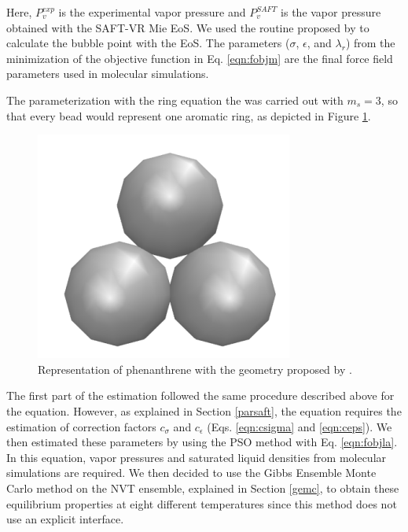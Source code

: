 Here, $P_{v}^{exp}$ is the experimental vapor pressure and $P_{v}^{SAFT}$ is the vapor pressure obtained with the SAFT-VR Mie EoS. We used the routine proposed by   to calculate the bubble point with the EoS. The parameters ($\sigma$, $\epsilon $, and $\lambda _{r}$) from the minimization of the objective function in Eq. \eqref{eqn:fobjm} are the final force field parameters used in molecular simulations. 

The parameterization with the ring equation the  was carried out with $m_{s}=3$, so that every bead would represent one aromatic ring, as depicted in Figure \ref{fig:fen3}.

\begin{figure}[th]
	\centering
	\includegraphics[width=0.15\linewidth]{Figures/fe3}
	\caption{Representation of phenanthrene with the geometry proposed by .}
	\label{fig:fen3}
\end{figure}

The first part of the estimation followed the same procedure described above for the  equation. However, as explained in Section \ref{parsaft}, the  equation requires the estimation of correction factors $c_{\sigma}$ and $c_{\epsilon}$ (Eqs. \eqref{eqn:csigma} and \eqref{eqn:ceps}). We then estimated these parameters by using the PSO method with Eq. \eqref{eqn:fobjla}. In this equation, vapor pressures and saturated liquid densities from molecular simulations are required. We then decided to use the Gibbs Ensemble Monte Carlo method on the NVT ensemble, explained in Section \ref{gemc}, to obtain these equilibrium properties at eight different temperatures since this method does not use an explicit interface.

